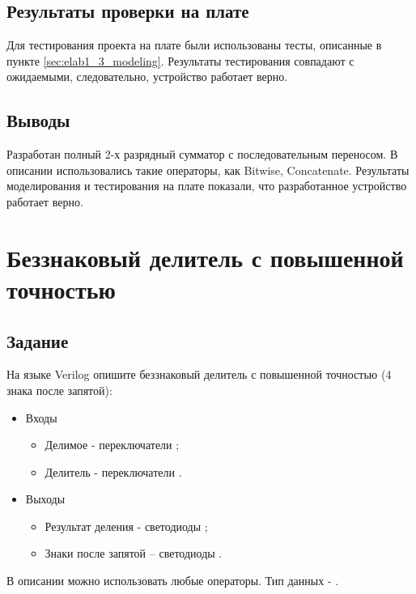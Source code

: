 \subsection{Результаты проверки на плате}

Для тестирования проекта на плате были использованы тесты, описанные в пункте \ref{sec:elab1_3_modeling}. Результаты тестирования совпадают с ожидаемыми, следовательно, устройство работает верно.

\subsection{Выводы}

Разработан полный 2-х разрядный сумматор с последовательным переносом. В описании использовались такие операторы, как Bitwise, Concatenate. Результаты моделирования и тестирования на плате показали, что разработанное устройство работает верно.

\newpage

\graphicspath{{../lab2/pics/}}

\section{Беззнаковый делитель с повышенной точностью}

\subsection{Задание}

На языке Verilog опишите беззнаковый делитель с повышенной точностью (4 знака после запятой):
\begin{itemize}
\item Входы
	\begin{itemize}
		\item Делимое - переключатели ;
		\item Делитель - переключатели .
	\end{itemize}
\item Выходы
	\begin{itemize}
		\item Результат деления - светодиоды ;
		\item Знаки после запятой – светодиоды .
	\end{itemize}
\end{itemize}

В описании можно использовать любые операторы. Тип данных - .

